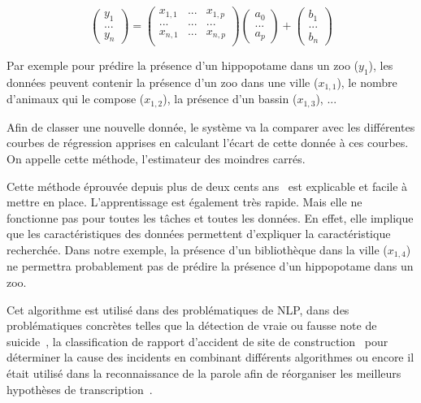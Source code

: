 \begin{equation}
  \begin{pmatrix} y_1\\ ...\\ y_n \end{pmatrix}
=
\begin{pmatrix} x_{1,1}& ...  & x_{1,p}  \\ ...& ... & ... \\ x_{n,1}& ... & x_{n,p}  \\ \end{pmatrix}
\begin{pmatrix} a_0\\ ...\\ a_p\end{pmatrix}
+
\begin{pmatrix} b_1\\ ...\\ b_n \end{pmatrix}
  \label{eq:regression_lineaire}
\end{equation}

Par exemple pour prédire la présence d'un hippopotame dans un zoo ($y_1$), les données peuvent contenir la présence d'un zoo dans une ville ($x_{1,1}$), le nombre d'animaux qui le compose ($x_{1,2}$), la présence d'un bassin ($x_{1,3}$), ...

Afin de classer une nouvelle donnée, le système va la comparer avec les différentes courbes de régression apprises en calculant l'écart de cette donnée à ces courbes. On appelle cette méthode, l'estimateur des moindres carrés.

Cette méthode éprouvée depuis plus de deux cents ans~\cite{Gauss1809,Legendre1805,Adrain1808} est explicable et facile à mettre en place.  L'apprentissage est également très rapide. Mais elle ne fonctionne pas pour toutes les tâches et toutes les données. En effet, elle implique que les caractéristiques des données permettent d'expliquer la caractéristique recherchée. Dans notre exemple, la présence d'un bibliothèque dans la ville ($x_{1,4}$) ne permettra probablement pas de prédire la présence d'un hippopotame dans un zoo.

Cet algorithme est utilisé dans des problématiques de NLP, dans des problématiques concrètes telles que la détection de vraie ou fausse note de suicide~\cite{Pestian2010}, la classification de rapport d'accident de site de construction~\cite{Zhang2019} pour déterminer la cause des incidents en combinant différents algorithmes ou encore il était utilisé dans la reconnaissance de la parole afin de réorganiser les meilleurs hypothèses de transcription~\cite{Chotimongkol2001}.

